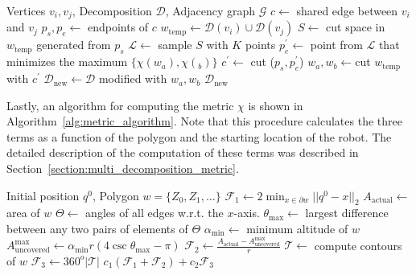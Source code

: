 \documentclass[../main.tex]{subfiles}
\begin{document}
\begin{algorithm}
	\caption{$\text{reopt\_cut}(v_i, v_j, \mathcal{D},\mathcal{G})$}
	\label{alg:reopt_cut}
	\begin{algorithmic}[1]
		\REQUIRE Vertices $v_i, v_j$, Decomposition $\mathcal{D}$, Adjacency graph $\mathcal{G}$
			\STATE $c\gets$ shared edge between $v_i$ and $v_j$ \label{line:shared_edge}
			\STATE $p_s,p_e\gets$ endpoints of $c$
			\STATE $w_{\text{temp}}\gets \mathcal{D}(v_i)\cup\mathcal{D}(v_j)$ \label{line:poly_union}
			\STATE $S\gets$ cut space in $w_{\text{temp}}$ generated from $p_s$ \label{line:multi_cut_space}
			\STATE $\mathcal{L}\gets$ sample $S$ with $K$ points \label{line:sample_cut_space}
			\STATE $p_e^{'}\gets$ point from $\mathcal{L}$ that minimizes the maximum $\{\chi(w_a),\chi(_b)\}$ \label{line:search}
			\STATE $c^{'}\gets$ cut ($p_s,p_e^{'}$)
			\STATE $w_a,w_b\gets$cut $w_{\text{temp}}$ with $c^{'}$ \label{line:perform_cut}
			\STATE $\mathcal{D}_{\text{new}}\gets\mathcal{D}$ modified with $w_a,w_b$
			\RETURN $\mathcal{D}_{\text{new}}$
	\end{algorithmic}
\end{algorithm}

Lastly, an algorithm for computing the metric $\chi$ is shown in Algorithm~\ref{alg:metric_algorithm}. Note that this procedure calculates the three terms as a function of the polygon and the starting location of the robot. The detailed description of the computation of these terms was described in Section~\ref{section:multi_decomposition_metric}.

\begin{algorithm}
	\caption{$\text{compute\_}\chi(q^0, w)$}
	\label{alg:metric_algorithm}
	\begin{algorithmic}[1]
		\REQUIRE Initial position $q^0$, Polygon $w=\{Z_0,Z_1,\ldots\}$ 
		\STATE $\mathcal{F}_1\gets2\min_{x\in\partial w}||q^0-x||_2$ \label{line:min_dist}
		\STATE $A_\text{actual}\gets$ area of $w$	\label{line:area}
		\STATE $\Theta\gets$ angles of all edges w.r.t. the $x$-axis.	\label{line:all_edge}
		\STATE $\theta_{\max}\gets$ largest difference between any two pairs of elements of $\Theta$ \label{line:all_pairs}
		\STATE $\alpha_{\min}\gets$ minimum altitude of $w$	\label{line:multi_alt}
		\STATE $A^{\max}_{\text{uncovered}}\gets\alpha_{\min}r(4\csc{\theta_{\max}}-\pi)$ \label{line:a_uncovered}
		\STATE $\mathcal{F}_2\gets\frac{A_\text{actual}-A^{\max}_{\text{uncovered}}}{r}$
		\STATE $\mathcal{T}\gets$ compute contours of $w$	\label{line:contours}
		\STATE $\mathcal{F}_3\gets360^o|\mathcal{T}|$
		\RETURN $c_1(\mathcal{F}_1+\mathcal{F}_2)+c_2\mathcal{F}_3$
	\end{algorithmic}
\end{algorithm}
\end{document}
